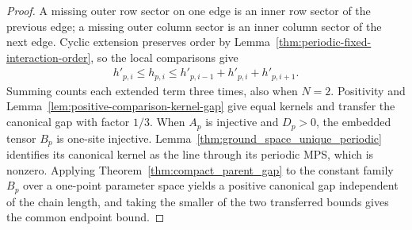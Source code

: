\begin{proof}
    \leanok
    A missing outer row sector on one edge is an inner row sector of
    the previous edge; a missing outer column sector is an inner column
    sector of the next edge. Cyclic extension preserves order by
    Lemma~\ref{thm:periodic-fixed-interaction-order}, so the local
    comparisons give
    \begin{align}
        h'_{p,i}\leq h_{p,i}
        \leq h'_{p,i-1}+h'_{p,i}+h'_{p,i+1}.
    \end{align}
    Summing counts each extended term three times, also when $N=2$.
    Positivity and Lemma~\ref{lem:positive-comparison-kernel-gap} give
    equal kernels and transfer the canonical gap with factor $1/3$.
    When $A_p$ is injective and $D_p>0$, the embedded tensor $B_p$ is
    one-site injective. Lemma~\ref{thm:ground_space_unique_periodic}
    identifies its canonical kernel as the line through its periodic MPS,
    which is nonzero. Applying
    Theorem~\ref{thm:compact_parent_gap} to the constant family $B_p$
    over a one-point parameter space yields a positive canonical
    gap independent of the chain length, and taking the smaller of the two
    transferred bounds gives the common endpoint bound.
\end{proof}
